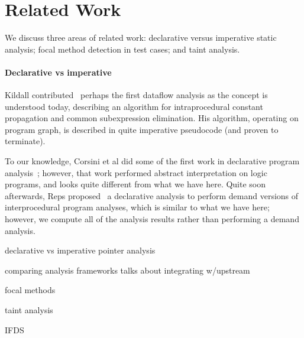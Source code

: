 \section{Related Work}
\label{sec:related}

We discuss three areas of related work: declarative versus imperative static analysis; focal method detection in test cases;
and taint analysis.

\paragraph{Declarative vs imperative}
Kildall contributed~\cite{kildall73:_unified_approac_global_progr_optim} perhaps the first dataflow analysis as the concept is understood today, describing an algorithm for intraprocedural constant propagation and common subexpression elimination. His algorithm, operating on program graph, is described in quite imperative pseudocode (and proven to terminate).

To our knowledge, Corsini et al did some of the first work in declarative program analysis~\cite{corsini93:_effic}; however, that work performed abstract interpretation on logic programs, and looks quite different from what we have here. Quite soon afterwards, Reps proposed~\cite{Reps1995} a declarative analysis to perform demand versions of interprocedural program analyses, which is similar to what we have here; however, we compute all of the analysis results rather than performing a demand analysis.


declarative vs imperative pointer analysis



\cite{scholz16:_fast_large_scale_progr_analy_datal}
\cite{conf/oopsla/BravenboerS09}

comparing analysis frameworks
\cite{prakash21:_effec_progr_repres_point_analy}
talks about integrating w/upstream



focal methods

taint analysis


IFDS
